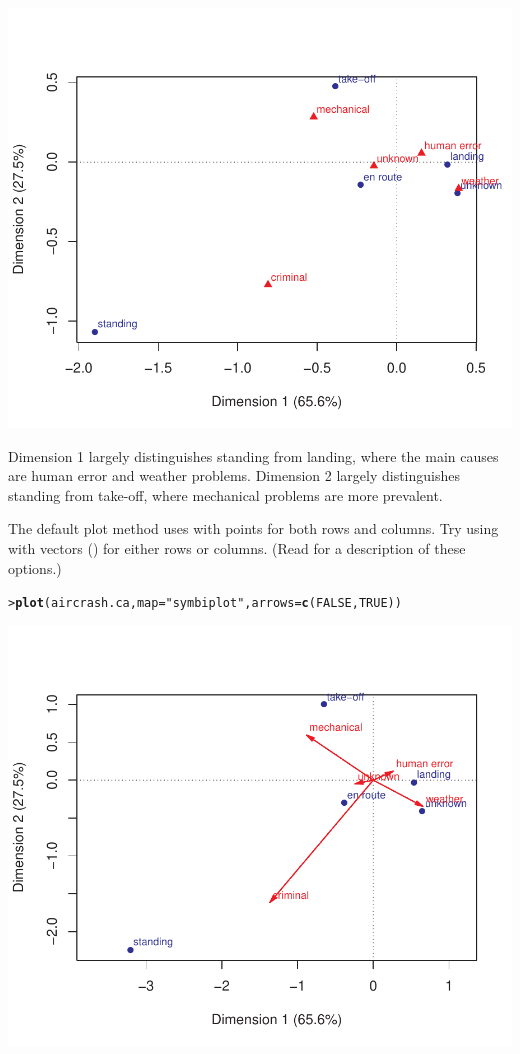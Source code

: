 \documentclass[10pt]{report}\usepackage[]{graphicx}\usepackage[]{color}
\makeatletter
\newcommand{\hlnum}[1]{\textcolor[rgb]{0.686,0.059,0.569}{#1}}%
\newcommand{\hlstr}[1]{\textcolor[rgb]{0.192,0.494,0.8}{#1}}%
\newcommand{\hlstd}[1]{\textcolor[rgb]{0.345,0.345,0.345}{#1}}%
\newcommand{\hlkwc}[1]{\textcolor[rgb]{0.333,0.667,0.333}{#1}}%
\newcommand{\hlkwd}[1]{\textcolor[rgb]{0.737,0.353,0.396}{\textbf{#1}}}%
\newenvironment{kframe}{%
 \def\at@end@of@kframe{}%
 \ifinner\ifhmode%
  \def\at@end@of@kframe{\end{minipage}}%
  \begin{minipage}{\columnwidth}%
 \fi\fi%
 \def\FrameCommand##1{\hskip\@totalleftmargin \hskip-\fboxsep
 \colorbox{shadecolor}{##1}\hskip-\fboxsep
     \hskip-\linewidth \hskip-\@totalleftmargin \hskip\columnwidth}%
 \MakeFramed {\advance\hsize-\width
   \@totalleftmargin\z@ \linewidth\hsize
   \@setminipage}}%
 {\par\unskip\endMakeFramed%
 \at@end@of@kframe}
\newenvironment{knitrout}{}{} %
\renewenvironment{knitrout}{\small\renewcommand{\baselinestretch}{.85}}{} %
\makeatother
\begin{document}
\begin{Exercises}
\begin{enumerate*}
\begin{ans}
\begin{knitrout}
\centerline{\includegraphics[width=.5\textwidth]{soln/fig/ex6_3b-1} }



\end{knitrout}
Dimension 1 largely distinguishes standing from landing, where the main causes are human error and weather problems.
Dimension 2 largely distinguishes standing from take-off, where mechanical problems are more prevalent.
    \end{ans}
    
    \item The default plot method uses  with points for both rows and columns.
    Try using  with vectors () for either rows or columns.
    (Read  for a description of these options.)
    \begin{ans}
\begin{knitrout}\footnotesize
{}\color{fgcolor}\begin{kframe}
\begin{alltt}
\hlstd{> }\hlkwd{plot}\hlstd{(aircrash.ca,} \hlkwc{map}\hlstd{=}\hlstr{"symbiplot"}\hlstd{,} \hlkwc{arrows}\hlstd{=}\hlkwd{c}\hlstd{(}\hlnum{FALSE}\hlstd{,} \hlnum{TRUE}\hlstd{))}
\end{alltt}
\end{kframe}

\centerline{\includegraphics[width=.5\textwidth]{soln/fig/ex6_3c-1} }




\end{knitrout}
\end{ans}
\end{enumerate*}
\end{Exercises}
\end{document}
